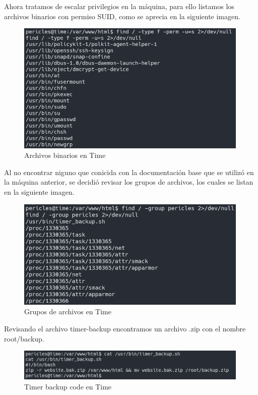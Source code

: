         \large{Ahora tratamos de escalar privilegios en la máquina, para ello listamos los archivos binarios con permiso SUID, como se aprecia en la siguiente imagen.}
        \par
        \begin{figure}[H]
            \centering
            \includegraphics[width=0.99\textwidth]{imagenes/time/09_bin_suid_time.png}
            \caption{Archivos binarios en Time}
        \end{figure}

        \large{Al no encontrar niguno que conicida con la documentación base que se utilizó en la máquina anterior, se decidió revisar los grupos de archivos, los cuales se listan en la siguiente imagen.}
        \par
        \begin{figure}[H]
            \centering
            \includegraphics[width=0.99\textwidth]{imagenes/time/10_files_group_time.png}
            \caption{Grupos de archivos en Time}
        \end{figure}

        \large{Revisando el archivo timer-backup encontramos un archivo .zip con el nombre root/backup.}
        \par
        \begin{figure}[H]
            \centering
            \includegraphics[width=0.99\textwidth]{imagenes/time/11_timer_backup_code.png}
            \caption{Timer backup code en Time}
        \end{figure}

